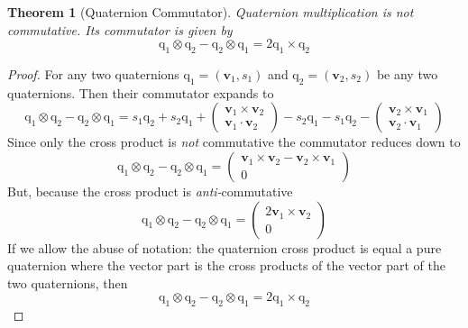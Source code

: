\documentclass{amsart}
\newtheorem{theorem}{Theorem}[section]
\theoremstyle{definition}
\theoremstyle{remark}
\numberwithin{equation}{section}
\begin{document}
\begin{theorem}[Quaternion Commutator]
  Quaternion multiplication is not commutative. Its commutator is given by
  \begin{equation}
    \mathrm{q}_1\otimes\mathrm{q}_2 - \mathrm{q}_2 \otimes \mathrm{q}_1 = 2 \mathrm{q}_1 \times \mathrm{q}_2 \label{eqn:commutator}
  \end{equation}
\end{theorem}
\begin{proof}
  For any two quaternions $\mathrm{q}_1=(\mathbf{v}_1, s_1)$ and $\mathrm{q}_2=(\mathbf{v}_2, s_2)$ be any two quaternions. Then their commutator expands to
  \begin{equation}
		\mathrm{q}_1\otimes\mathrm{q}_2 - \mathrm{q}_2 \otimes \mathrm{q}_1 =s_1 \mathrm{q}_2 + s_2 \mathrm{q}_1
		+
		\begin{pmatrix}
			\mathbf{v}_1\times\mathbf{v}_2 \\
			\mathbf{v}_1\cdot\mathbf{v}_2
		\end{pmatrix}
		- s_2 \mathrm{q}_1 - s_1 \mathrm{q}_2
		-
		\begin{pmatrix}
			\mathbf{v}_2\times\mathbf{v}_1 \\
			\mathbf{v}_2\cdot\mathbf{v}_1
		\end{pmatrix}
  \end{equation}
	Since only the cross product is \emph{not} commutative the commutator reduces down to
  \begin{equation}
		\mathrm{q}_1\otimes\mathrm{q}_2 - \mathrm{q}_2 \otimes \mathrm{q}_1 =
		\begin{pmatrix}
			\mathbf{v}_1\times\mathbf{v}_2-\mathbf{v}_2\times\mathbf{v}_1 \\
			0
		\end{pmatrix}
  \end{equation}
	But, because  the cross product is \emph{anti-}commutative
	\begin{equation}
		\mathrm{q}_1\otimes\mathrm{q}_2 - \mathrm{q}_2 \otimes \mathrm{q}_1 =
		\begin{pmatrix}
			2\mathbf{v}_1\times\mathbf{v}_2\\
			0
		\end{pmatrix}
	\end{equation}
	If we allow the abuse of notation: the quaternion cross product is equal a pure quaternion where the vector part is the cross products of the vector part of the two quaternions, then
	\begin{equation}
		\mathrm{q}_1\otimes\mathrm{q}_2 - \mathrm{q}_2 \otimes \mathrm{q}_1 = 2 \mathrm{q}_1\times \mathrm{q}_2
	\end{equation}
\end{proof}
\end{document}
